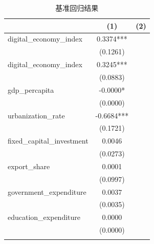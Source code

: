 \begin{table}[htbp]
\centering
\caption{基准回归结果}
\label{tab:baseline}
\begin{tabular}{lcc}
\toprule
 & (1) & (2) \\
\midrule
digital_economy_index & 0.3374*** \\
  & (0.1261) \\
digital_economy_index & 0.3245*** \\
  & (0.0883) \\
gdp_percapita & -0.0000* \\
  & (0.0000) \\
urbanization_rate & -0.6684*** \\
  & (0.1721) \\
fixed_capital_investment & 0.0046 \\
  & (0.0273) \\
export_share & 0.0001 \\
  & (0.0997) \\
government_expenditure & 0.0037 \\
  & (0.0035) \\
education_expenditure & 0.0000 \\
  & (0.0000) \\ \\
\bottomrule
\end{tabular}
\end{table}

